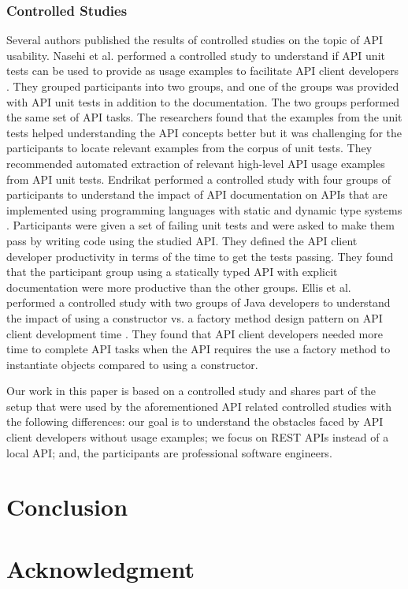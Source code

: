 \documentclass[conference]{IEEEtran}
\begin{document}
\subsubsection{Controlled Studies}
Several authors published the results of controlled studies on the topic of API usability. Nasehi et al. performed a controlled study to understand if API unit tests can be used to provide as usage examples to facilitate API client developers \cite{5609553}. They grouped participants into two groups, and one of the groups was provided with API unit tests in addition to the documentation. The two groups performed the same set of API tasks. The researchers found that the examples from the unit tests helped understanding the API concepts better but it was challenging for the participants to locate relevant examples from the corpus of unit tests. They recommended automated extraction of relevant high-level API usage examples from API unit tests. Endrikat performed a controlled study with four groups of participants to understand the impact of API documentation on APIs that are implemented using programming languages with static and dynamic type systems \cite{Endrikat:2014:ADS:2568225.2568299}. Participants were given a set of failing unit tests and were asked to make them pass by writing code using the studied API. They defined the API client developer productivity in terms of the time to get the tests passing. They found that the participant group using a statically typed API with explicit documentation were more productive than the other groups. Ellis et al. performed a controlled study with two groups of Java developers to understand the impact of using a constructor vs. a factory method design pattern on API client development time \cite{Ellis:2007:FPA:1248820.1248863}. They found that API client developers needed more time to complete API tasks when the API requires the use a factory method to instantiate objects compared to using a constructor.

Our work in this paper is based on a controlled study and shares part of the setup that were used by the aforementioned API related controlled studies with the following differences: our goal is to understand the obstacles faced by API client developers without usage examples;  we focus on REST APIs instead of a local API; and, the participants are professional software engineers.

\section{Conclusion}
\section*{Acknowledgment}



\end{document}
